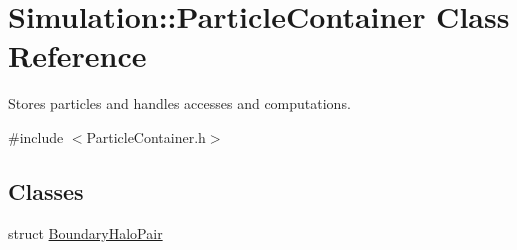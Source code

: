 \hypertarget{classSimulation_1_1ParticleContainer}{\section{Simulation\-:\-:Particle\-Container Class Reference}
\label{classSimulation_1_1ParticleContainer}
}


Stores particles and handles accesses and computations.  




{\ttfamily \#include $<$Particle\-Container.\-h$>$}

\subsection*{Classes}
\begin{DoxyCompactItemize}
\item 
struct \hyperlink{structSimulation_1_1ParticleContainer_1_1BoundaryHaloPair}{Boundary\-Halo\-Pair}
\end{DoxyCompactItemize}
